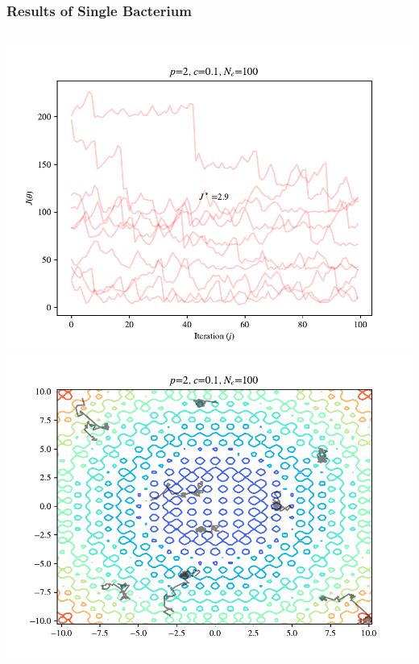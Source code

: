 \documentclass{beamer}
\begin{document}

\begin{frame}
\frametitle{Results of Single Bacterium}
\begin{columns}
    \begin{center}
      \includegraphics[scale=0.3]{assets/rastrigin_J}
      \includegraphics[scale=0.3]{assets/rastrigin_theta}

\end{center}
\end{columns}
\end{frame}
\end{document}
